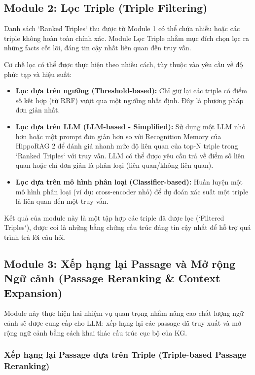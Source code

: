 \documentclass[../main.tex]{subfiles}
\begin{document}
\subsection{Module 2: Lọc Triple (Triple Filtering)}

Danh sách `Ranked Triples` thu được từ Module 1 có thể chứa nhiễu hoặc các triple không hoàn toàn chính xác. Module Lọc Triple nhằm mục đích chọn lọc ra những facts cốt lõi, đáng tin cậy nhất liên quan đến truy vấn.

Cơ chế lọc có thể được thực hiện theo nhiều cách, tùy thuộc vào yêu cầu về độ phức tạp và hiệu suất:
\begin{itemize}
    \item \textbf{Lọc dựa trên ngưỡng (Threshold-based):} Chỉ giữ lại các triple có điểm số kết hợp (từ RRF) vượt qua một ngưỡng nhất định. Đây là phương pháp đơn giản nhất.
    \item \textbf{Lọc dựa trên LLM (LLM-based - Simplified):} Sử dụng một LLM nhỏ hơn hoặc một prompt đơn giản hơn so với Recognition Memory của HippoRAG 2 để đánh giá nhanh mức độ liên quan của top-N triple trong `Ranked Triples` với truy vấn. LLM có thể được yêu cầu trả về điểm số liên quan hoặc chỉ đơn giản là phân loại (liên quan/không liên quan).
    \item \textbf{Lọc dựa trên mô hình phân loại (Classifier-based):} Huấn luyện một mô hình phân loại (ví dụ: cross-encoder nhỏ) để dự đoán xác suất một triple là liên quan đến một truy vấn.
\end{itemize}
Kết quả của module này là một tập hợp các triple đã được lọc (`Filtered Triples`), được coi là những bằng chứng cấu trúc đáng tin cậy nhất để hỗ trợ quá trình trả lời câu hỏi.

\subsection{Module 3: Xếp hạng lại Passage và Mở rộng Ngữ cảnh (Passage Reranking \& Context Expansion)}

Module này thực hiện hai nhiệm vụ quan trọng nhằm nâng cao chất lượng ngữ cảnh sẽ được cung cấp cho LLM: xếp hạng lại các passage đã truy xuất và mở rộng ngữ cảnh bằng cách khai thác cấu trúc cục bộ của KG.

\subsubsection{Xếp hạng lại Passage dựa trên Triple (Triple-based Passage Reranking)}
\end{document}
